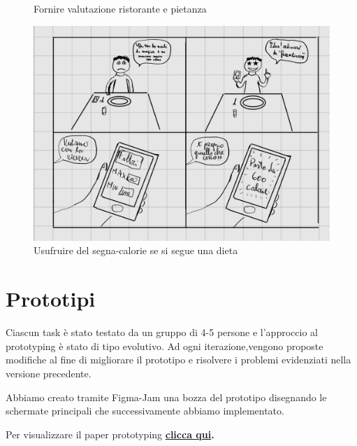 \documentclass{article}
\begin{document}
\begin{figure}[htpb]
\begin{minipage}{0.40\textwidth}
    \caption[Terza figura]{Fornire valutazione ristorante e pietanza}\label{fig:3}
\end{minipage}
\hspace{2cm}
\begin{minipage}{0.40\textwidth}
    \includegraphics[width=\textwidth]{Data/StoryBoard/Filtro_calorie.jpeg}
    \caption[Quarta figura]{Usufruire del segna-calorie se si segue una dieta}\label{fig:4}
\end{minipage}
\end{figure}

\vspace{4cm}
\section{Prototipi}
    Ciascun task è stato testato da un gruppo di 4-5 persone e l'approccio al prototyping è stato di tipo evolutivo. Ad ogni iterazione,vengono proposte modifiche al fine di migliorare il prototipo e risolvere i problemi evidenziati nella versione precedente.\par
    \vspace{1cm}
    \vspace{0.5cm}
    \par Abbiamo creato tramite Figma-Jam una bozza del prototipo disegnando le schermate principali che successivamente abbiamo implementato.
    \par Per visualizzare il paper prototyping \textbf{\href{https://t.ly/AbuU}{clicca qui}.}
\end{document}
